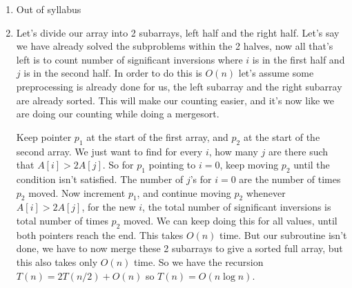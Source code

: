 \documentclass[12pt]{report}
\begin{document}
\begin{enumerate}[label=\textbf{\arabic*.}]
  \item Out of syllabus
  
  \item Let's divide our array into 2 subarrays, left half and the right half. Let's say we have already solved the subproblems within the 2
  halves, now all that's left is to count number of significant inversions where $i$ is in the first half and $j$ is in the second half. In order to 
  do this is $O(n)$ let's assume some preprocessing is already done for us, the left subarray and the right subarray are already sorted. This will
  make our counting easier, and it's now like we are doing our counting while doing a mergesort.
  
  Keep pointer $p_1$ at the start of the first array, and $p_2$ at the start of the second array. We just want to find for every $i$, how many $j$
  are there such that $A[i] > 2A[j]$. So for $p_1$ pointing to $i=0$, keep moving $p_2$ until the condition isn't satisfied. The number of $j$'s for 
  $i=0$ are the number of times $p_2$ moved. Now increment $p_1$, and continue moving $p_2$ whenever $A[i] > 2A[j]$, for the new $i$, the total number 
  of significant inversions is total number of times $p_2$ moved. We can keep doing this for all values, until both pointers reach the end. This takes 
  $O(n)$ time. But our subroutine isn't done, we have to now merge these 2 subarrays to give a sorted full array, but this also takes only $O(n)$ time.
  So we have the recursion $T(n) = 2T(n/2) + O(n)$ so $T(n) = O(n \log n)$.

  \end{enumerate}
\end{document}
